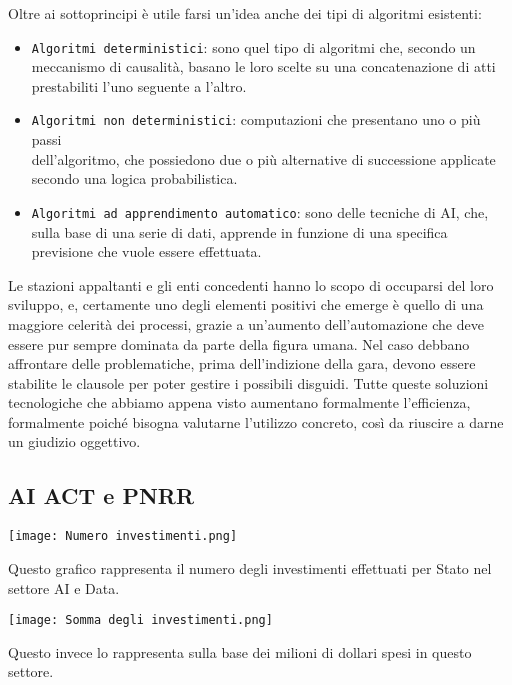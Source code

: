 \documentclass{article}
\begin{document}
\begin{justify}
\begin{itemize}
    \end{itemize}
    Oltre ai sottoprincipi è utile farsi un'idea anche dei tipi di algoritmi esistenti:
    \begin{itemize}
        \item \texttt{Algoritmi deterministici}: sono quel tipo di algoritmi che, secondo un meccanismo di causalità, basano le loro scelte su una concatenazione di atti prestabiliti l'uno seguente a l'altro.
        \item \texttt{Algoritmi non deterministici}: computazioni che presentano uno o più passi\\ dell'algoritmo, che possiedono due o più alternative di successione applicate secondo una logica probabilistica.
        \item \texttt{Algoritmi ad apprendimento automatico}: sono delle tecniche di AI, che, sulla base di una serie di dati, apprende in funzione di una specifica previsione che vuole essere effettuata.
    \end{itemize}
    Le stazioni appaltanti e gli enti concedenti hanno lo scopo di occuparsi del loro sviluppo, e,  certamente uno degli elementi positivi che emerge è quello di una maggiore celerità dei processi, grazie a un'aumento dell'automazione che deve essere pur sempre dominata da parte della figura umana. Nel caso debbano affrontare delle problematiche, prima dell'indizione della gara, devono essere stabilite le clausole per poter gestire i possibili disguidi.
    Tutte queste soluzioni tecnologiche che abbiamo appena visto aumentano formalmente l'efficienza, formalmente poiché bisogna valutarne l'utilizzo concreto, così da riuscire a darne un giudizio oggettivo.\\
\end{justify}

\newpage\subsection{AI ACT e PNRR}
\begin{center}
    \texttt{[image: Numero investimenti.png]}
\end{center}
\begin{justify}
    Questo grafico rappresenta il numero degli investimenti effettuati per Stato nel settore AI e Data.
\end{justify}

\begin{center}
    \texttt{[image: Somma degli investimenti.png]}
\end{center}
\begin{justify}
    Questo invece lo rappresenta sulla base dei milioni di dollari spesi in questo settore.
\end{justify}
\end{document}
